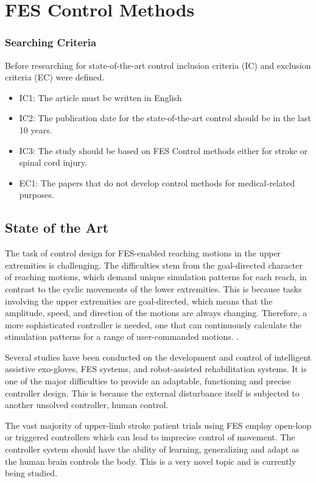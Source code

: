\newpage
\section{FES Control Methods}
\subsubsection{Searching Criteria}
Before researching for state-of-the-art control inclusion criteria (IC) and exclusion criteria (EC) were defined.
\begin{itemize}
    \item IC1: The article must be written in English
    \item IC2: The publication date for the state-of-the-art control should be in the last 10 years.
    \item IC3: The study should be based on FES Control methods either for stroke or spinal cord injury.
    \item EC1: The papers that do not develop control methods  for  medical-related purposes.
\end{itemize}
\subsection{State of the Art}
The task of control design for FES-enabled reaching motions in the upper extremities is challenging. The difficulties stem from the goal-directed character of reaching motions, which demand unique simulation patterns for each reach, in contrast to the cyclic movements of the lower extremities. This is because tasks involving the upper extremities are goal-directed, which means that the amplitude, speed, and direction of the motions are always changing. Therefore, a more sophisticated controller is needed, one that can continuously calculate the stimulation patterns for a range of user-commanded motions. \cite{CFF}.

Several studies have been conducted on the development and control of intelligent assistive exo-gloves, FES systems, and robot-assisted rehabilitation systems. It is one of the major difficulties to provide an adaptable, functioning and precise controller design. This is because the external disturbance itself is subjected to another unsolved controller, human control. 

The vast majority of upper-limb stroke patient trials using FES employ open-loop or triggered controllers which can lead to imprecise control of movement. The controller system should have the ability of learning, generalizing and adapt as the human brain controls the body. This is a very novel topic and is currently being studied.

